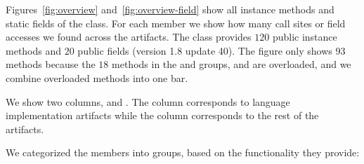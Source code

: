 Figures~\ref{fig:overview} and~\ref{fig:overview-field} show all instance methods and static fields of the \smu{} class.
For each member we show how many call sites or field accesses we found across the artifacts. The class provides $120$ public instance methods and $20$ public fields (version 1.8 update 40). The figure only shows $93$ methods because the $18$ methods in the  and  groups, and  are overloaded, and we combine overloaded methods into one bar.

We show two columns,  and .
The  column corresponds to language implementation artifacts while the  column corresponds to the rest of the artifacts.

We categorized the members into groups, based on the functionality they provide:

